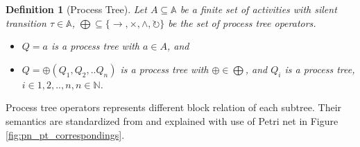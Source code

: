 \documentclass[]{article}
\newtheorem{mydef}{Definition}[section]
\begin{document}
\begin{mydef}[Process Tree]
	Let $ A \subseteq \mathbb{A} $ be a finite set of activities with silent transition $\tau \in \mathbb{A}$, $\bigoplus \subseteq \{\rightarrow, \times, \land, \circlearrowright\}$ be the set of process tree operators. 
	\begin{itemize}
		\item $Q=a$ is a process tree with $a\in A$, and 
		\item $Q= \oplus (Q_1 , Q_2 ,.. Q_n)$ is a process tree with $\oplus \in \bigoplus$, and $Q_i$ is a process tree, $i\in{1,2,..,n}, n\in \mathbb{N}$. 
	\end{itemize}
\end{mydef}
Process tree operators represents different block relation of each subtree. Their semantics are standardized from \cite{vanderAalst:2016:PMD:2948762, Buijs2012OnTR} and explained with use of Petri net in Figure \ref{fig:pn_pt_correspondings}\cite{Buijs2012OnTR}.
\end{document}
